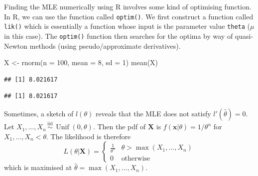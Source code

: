 \documentclass[
]{book}
\newenvironment{Shaded}{\begin{snugshade}}{\end{snugshade}}
\newcommand{\AttributeTok}[1]{\textcolor[rgb]{0.77,0.63,0.00}{#1}}
\newcommand{\CommentTok}[1]{\textcolor[rgb]{0.56,0.35,0.01}{\textit{#1}}}
\newcommand{\ConstantTok}[1]{\textcolor[rgb]{0.00,0.00,0.00}{#1}}
\newcommand{\ControlFlowTok}[1]{\textcolor[rgb]{0.13,0.29,0.53}{\textbf{#1}}}
\newcommand{\DecValTok}[1]{\textcolor[rgb]{0.00,0.00,0.81}{#1}}
\newcommand{\FunctionTok}[1]{\textcolor[rgb]{0.00,0.00,0.00}{#1}}
\newcommand{\NormalTok}[1]{#1}
\newcommand{\OtherTok}[1]{\textcolor[rgb]{0.56,0.35,0.01}{#1}}
\newcommand{\SpecialCharTok}[1]{\textcolor[rgb]{0.00,0.00,0.00}{#1}}
\newcommand{\StringTok}[1]{\textcolor[rgb]{0.31,0.60,0.02}{#1}}
\newcommand{\bx}{{\boldsymbol x}}
\newcommand{\bX}{{\boldsymbol X}}
\DeclareMathOperator{\Unif}{Unif}
\newcommand{\iid}{\,\overset{\text{iid}}{\sim}\,}
\theoremstyle{definition}
\theoremstyle{definition}
\theoremstyle{definition}
\theoremstyle{definition}
\theoremstyle{remark}
\begin{document}
Finding the MLE numerically using R involves some kind of optimising function.
In R, we can use the function called \texttt{optim()}.
We first construct a function called \texttt{lik()} which is essentially a function whose input is the parameter value \texttt{theta} (\(\mu\) in this case).
The \texttt{optim()} function then searches for the optima by way of quasi-Newton methods (using pseudo/approximate derivatives).

\begin{Shaded}
\begin{Highlighting}[]
\NormalTok{X }\OtherTok{\textless{}{-}} \FunctionTok{rnorm}\NormalTok{(}\AttributeTok{n =} \DecValTok{100}\NormalTok{, }\AttributeTok{mean =} \DecValTok{8}\NormalTok{, }\AttributeTok{sd =} \DecValTok{1}\NormalTok{)}
\FunctionTok{mean}\NormalTok{(X)}
\end{Highlighting}
\end{Shaded}

\begin{verbatim}
## [1] 8.021617
\end{verbatim}

\begin{Shaded}
\end{Shaded}

\begin{verbatim}
## [1] 8.021617
\end{verbatim}

Sometimes, a sketch of \(l(\theta)\) reveals that the MLE does not satisfy \(l'(\hat\theta)=0\).
Let \(X_1,\dots,X_n\iid\Unif(0,\theta)\). Then the pdf of \(\bX\) is \(f(\bx|\theta) = 1/\theta^n\) for \(X_1,\dots,X_n < \theta\). The likelihood is therefore
\[
L(\theta|\bX) = \begin{cases}
\frac{1}{\theta^n} &\theta > \max(X_1,\dots,X_n) \\
0 &\text{otherwise}
\end{cases}
\]
which is maximised at \(\hat\theta = \max(X_1,\dots,X_n)\).
\end{document}
